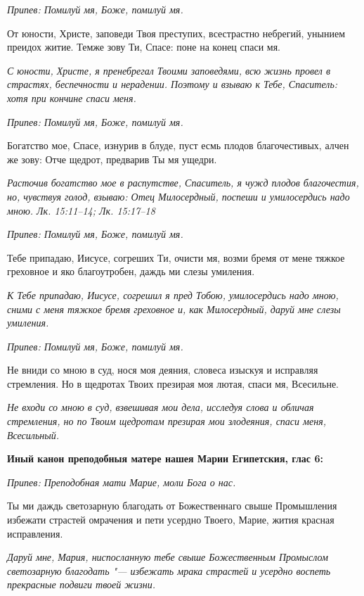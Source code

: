 \itshape Припев:\normalfont{} Помилуй мя, Боже, помилуй мя.


От юности, Христе, заповеди Твоя преступих, всестрастно небрегий, унынием преидох житие. Темже зову Ти, Спасе: поне на конец спаси мя.


\itshape С юности, Христе, я пренебрегал Твоими заповедями, всю жизнь провел в страстях, беспечности и нерадении. Поэтому и взываю к Тебе, Спаситель: хотя при кончине спаси меня.\normalfont{}


\itshape Припев:\normalfont{} Помилуй мя, Боже, помилуй мя.


Богатство мое, Спасе, изнурив в блуде, пуст есмь плодов благочестивых, алчен же зову: Отче щедрот, предварив Ты мя ущедри.


\itshape Расточив богатство мое в распутстве, Спаситель, я чужд плодов благочестия, но, чувствуя голод, взываю: Отец Милосердный, поспеши и умилосердись надо мною. Лк. 15:11–14; Лк. 15:17–18\normalfont{}


\itshape Припев:\normalfont{} Помилуй мя, Боже, помилуй мя.


Тебе припадаю, Иисусе, согреших Ти, очисти мя, возми бремя от мене тяжкое греховное и яко благоутробен, даждь ми слезы умиления.


\itshape К Тебе припадаю, Иисусе, согрешил я пред Тобою, умилосердись надо мною, сними с меня тяжкое бремя греховное и, как Милосердный, даруй мне слезы умиления.\normalfont{}


\itshape Припев:\normalfont{} Помилуй мя, Боже, помилуй мя.


Не вниди со мною в суд, нося моя деяния, словеса изыскуя и исправляя стремления. Но в щедротах Твоих презирая моя лютая, спаси мя, Всесильне.


\itshape Не входи со мною в суд, взвешивая мои дела, исследуя слова и обличая стремления, но по Твоим щедротам презирая мои злодеяния, спаси меня, Всесильный.\normalfont{}





\bfseries Иный канон преподобныя матере нашея Марии Египетския, глас 6:\normalfont{}


\itshape Припев:\normalfont{} Преподобная мати Марие, моли Бога о нас.


Ты ми даждь светозарную благодать от Божественнаго свыше Промышления избежати страстей омрачения и пети усердно Твоего, Марие, жития красная исправления.


\itshape Даруй мне, Мария, ниспосланную тебе свыше Божественным Промыслом светозарную благодать "--- избежать мрака страстей и усердно воспеть прекрасные подвиги твоей жизни.\normalfont{}


